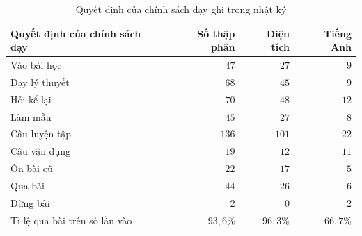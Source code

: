 \begin{table}[H]
\centering
\caption{Quyết định của chính sách dạy ghi trong nhật ký}\label{tab:db-nodes}
\begin{tabular}{lrrr}
\toprule
Quyết định của chính sách dạy & Số thập phân & Diện tích & Tiếng Anh \\
\midrule
Vào bài học & $47$ & $27$ & $9$ \\
Dạy lý thuyết & $68$ & $45$ & $9$ \\
Hỏi kể lại & $70$ & $48$ & $12$ \\
Làm mẫu & $45$ & $27$ & $8$ \\
Câu luyện tập & $136$ & $101$ & $22$ \\
Câu vận dụng & $19$ & $12$ & $11$ \\
Ôn bài cũ & $22$ & $17$ & $5$ \\
Qua bài & $44$ & $26$ & $6$ \\
Dừng bài & $2$ & $0$ & $2$ \\
\midrule
Tỉ lệ qua bài trên số lần vào & $93{,}6$\% & $96{,}3$\% & $66{,}7$\% \\
\bottomrule
\end{tabular}
\end{table}
